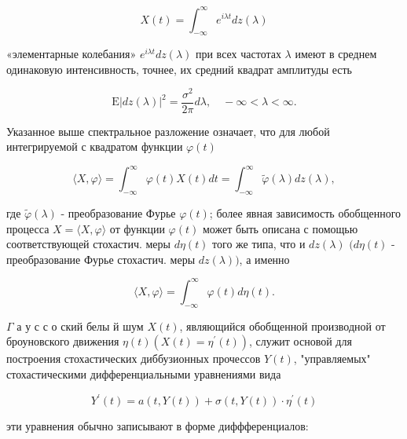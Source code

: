 \documentclass[10pt]{article}
\begin{document}
\[

X(t)=\int_{-\infty}^{\infty} e^{i \lambda t} d z(\lambda)

\]



«элементарные колебания» $e^{i \lambda t} d z(\lambda)$ при всех частотах $\lambda$ имеют в среднем одинаковую интенсивность, точнее, их средний квадрат амплитуды есть



\[

\mathrm{E}|d z(\lambda)|^{2}=\frac{\sigma^{2}}{2 \pi} d \lambda, \quad-\infty<\lambda<\infty .

\]



Указанное выше спектральное разложение означает, что для любой интегрируемой с квадратом функции $\varphi(t)$



\[

\langle X, \varphi\rangle=\int_{-\infty}^{\infty} \varphi(t) X(t) d t=\int_{-\infty}^{\infty} \tilde{\varphi}(\lambda) d z(\lambda),

\]



где $\tilde{\varphi}(\lambda)$ - преобразование Фурье $\varphi(t)$; более явная зависимость обобщенного процесса $X=\langle X, \varphi\rangle$ от функции $\varphi(t)$ может быть описана с помощью соответствующей стохастич. меры $d \eta(t)$ того же типа, что и $d z(\lambda)$ $(d \eta(t)$ - преобразование Фурье стохастич. меры $d z(\lambda))$, а именно



\[

\langle X, \varphi\rangle=\int_{-\infty}^{\infty} \varphi(t) d \eta(t) .

\]



$\Gamma$ а у с с о ский белы й шум $X(t)$, являющийся обобщенной производной от броуновского движения $\eta(t)\left(X(t)=\eta^{\prime}(t)\right)$, служит основой для построения стохастических диббузионных прочессов $Y(t)$, "управляемых" стохастическими дифференциальными уравнениями вида



\[

Y^{\prime}(t)=a(t, Y(t))+\sigma(t, Y(t)) \cdot \eta^{\prime}(t)

\]



эти уравнения обычно записывают в форме диффференциалов:
\end{document}
